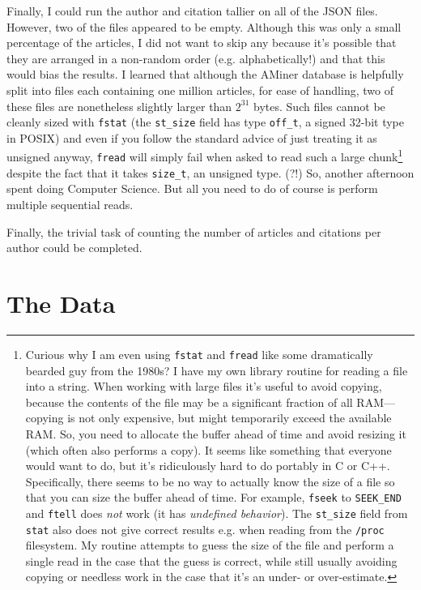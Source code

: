 \documentclass[twocolumn]{article}
\begin{document}
Finally, I could run the author and citation tallier on all of the
JSON files. However, two of the files appeared to be empty. Although
this was only a small percentage of the articles, I did not want to
skip any because it's possible that they are arranged in a non-random
order (e.g. alphabetically!) and that this would bias the results. I
learned that although the AMiner database is helpfully split into
files each containing one million articles, for ease of handling, two
of these files are nonetheless slightly larger than $2^{31}$ bytes. Such
files cannot be cleanly sized with \verb+fstat+ (the \verb+st_size+
field has type \verb+off_t+, a signed 32-bit type in POSIX) and even
if you follow the standard advice of just treating it as unsigned
anyway, \verb+fread+ will simply fail when asked to read such a large
chunk\footnote{
%
  Curious why I am even using {\tt fstat} and {\tt fread} like some
  dramatically bearded guy from the 1980s? I have my own library
  routine for reading a file into a string. When working with large
  files it's useful to avoid copying, because the contents of the file
  may be a significant fraction of all RAM---copying is not only
  expensive, but might temporarily exceed the available RAM. So, you
  need to allocate the buffer ahead of time and avoid resizing it
  (which often also performs a copy). It seems like something that
  everyone would want to do, but it's ridiculously hard to do portably
  in C or C++. Specifically, there seems to be no way to actually know
  the size of a file so that you can size the buffer ahead of time.
  For example, {\tt fseek} to {\tt SEEK\_END} and {\tt ftell} does
  {\em not} work (it has {\em undefined behavior}). The {\tt st\_size}
  field from {\tt stat} also does not give correct results e.g. when
  reading from the {\tt /proc} filesystem. My routine attempts to
  guess the size of the file and perform a single read in the case
  that the guess is correct, while still usually avoiding copying or
  needless work in the case that it's an under- or over-estimate.
%
} despite the fact that it takes \verb+size_t+, an unsigned type. (?!)
So, another afternoon spent doing Computer Science. But all you need
to do of course is perform multiple sequential reads.

Finally, the trivial task of counting the number of articles and
citations per author could be completed.

\section{The Data}
\end{document}

